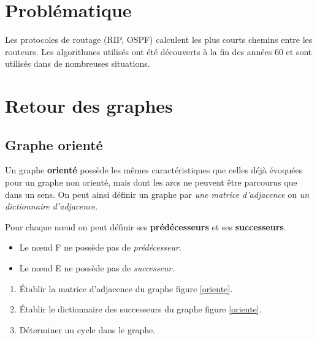 \documentclass[a4paper,11pt]{article}
\begin{document}
\section{Problématique}
Les protocoles de routage (RIP, OSPF) calculent les plus courts chemins entre les routeurs. Les algorithmes utilisés ont été découverts à la fin des années 60 et sont utilisés dans de nombreuses situations.
\begin{center}
\end{center}
\section{Retour des graphes}
\subsection{Graphe orienté}
Un graphe \textbf{orienté} possède les mêmes caractéristiques que celles déjà évoquées pour un graphe non orienté, mais dont les arcs ne peuvent être parcourus que dans un sens. On peut ainsi définir un graphe par \emph{une matrice d'adjacence} ou \emph{un dictionnaire d'adjacence}.
\begin{center}
    \label{oriente}
\end{center}
\begin{aretenir}[]
    Pour chaque nœud on peut définir ses \textbf{prédécesseurs} et ses \textbf{successeurs}.
    \begin{itemize}
        \item Le nœud F ne possède pas de \emph{prédécesseur}.
        \item Le nœud E ne possède pas de \emph{successeur}.
    \end{itemize}
\end{aretenir}
\begin{activite}
    \begin{enumerate}
        \item Établir la matrice d'adjacence du graphe figure \ref{oriente}.
        \item Établir le dictionnaire des successeurs du graphe figure \ref{oriente}.
        \item Déterminer un cycle dans le graphe.
    \end{enumerate}
\end{activite}
\end{document}
